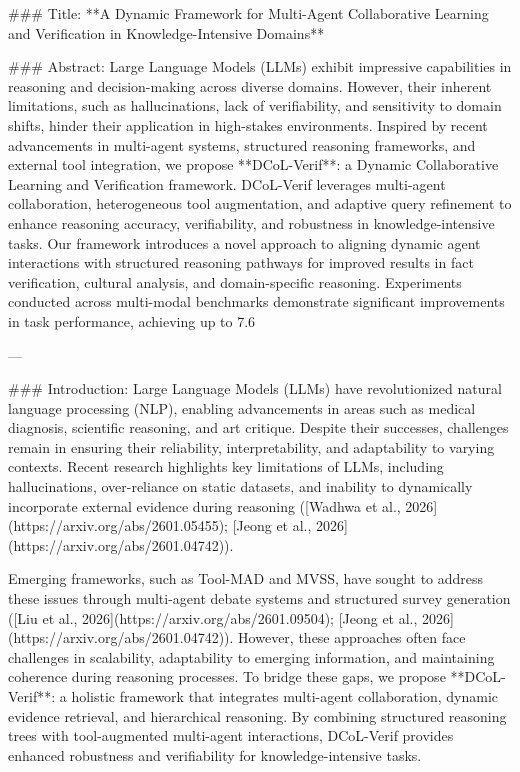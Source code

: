 ### Title:
**A Dynamic Framework for Multi-Agent Collaborative Learning and Verification in Knowledge-Intensive Domains**

### Abstract:
Large Language Models (LLMs) exhibit impressive capabilities in reasoning and decision-making across diverse domains. However, their inherent limitations, such as hallucinations, lack of verifiability, and sensitivity to domain shifts, hinder their application in high-stakes environments. Inspired by recent advancements in multi-agent systems, structured reasoning frameworks, and external tool integration, we propose **DCoL-Verif**: a Dynamic Collaborative Learning and Verification framework. DCoL-Verif leverages multi-agent collaboration, heterogeneous tool augmentation, and adaptive query refinement to enhance reasoning accuracy, verifiability, and robustness in knowledge-intensive tasks. Our framework introduces a novel approach to aligning dynamic agent interactions with structured reasoning pathways for improved results in fact verification, cultural analysis, and domain-specific reasoning. Experiments conducted across multi-modal benchmarks demonstrate significant improvements in task performance, achieving up to 7.6%

---

### Introduction:
Large Language Models (LLMs) have revolutionized natural language processing (NLP), enabling advancements in areas such as medical diagnosis, scientific reasoning, and art critique. Despite their successes, challenges remain in ensuring their reliability, interpretability, and adaptability to varying contexts. Recent research highlights key limitations of LLMs, including hallucinations, over-reliance on static datasets, and inability to dynamically incorporate external evidence during reasoning ([Wadhwa et al., 2026](https://arxiv.org/abs/2601.05455); [Jeong et al., 2026](https://arxiv.org/abs/2601.04742)).

Emerging frameworks, such as Tool-MAD and MVSS, have sought to address these issues through multi-agent debate systems and structured survey generation ([Liu et al., 2026](https://arxiv.org/abs/2601.09504); [Jeong et al., 2026](https://arxiv.org/abs/2601.04742)). However, these approaches often face challenges in scalability, adaptability to emerging information, and maintaining coherence during reasoning processes. To bridge these gaps, we propose **DCoL-Verif**: a holistic framework that integrates multi-agent collaboration, dynamic evidence retrieval, and hierarchical reasoning. By combining structured reasoning trees with tool-augmented multi-agent interactions, DCoL-Verif provides enhanced robustness and verifiability for knowledge-intensive tasks.

